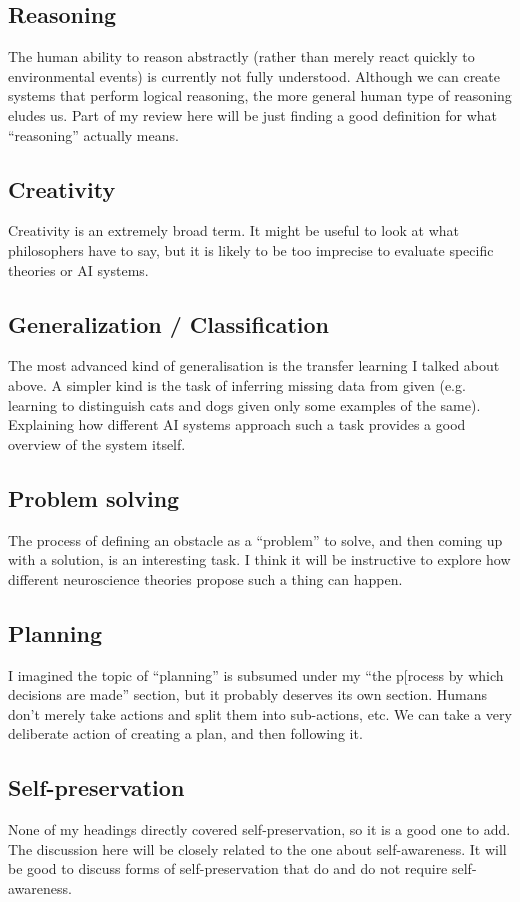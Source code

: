 \documentclass[10pt,a4paper]{article}
\newcommand{\nquote}[1]{``{#1}''}
\begin{document}
\subsection{Reasoning}
The human ability to reason abstractly (rather than merely react quickly to environmental events) is currently not fully understood. Although we can create systems that perform logical reasoning, the more general human type of reasoning eludes us. Part of my review here will be just finding a good definition for what \nquote{reasoning} actually means.

\subsection{Creativity}
Creativity is an extremely broad term. It might be useful to look at what philosophers have to say, but it is likely to be too imprecise to evaluate specific theories or AI systems.

\subsection{Generalization / Classification}
The most advanced kind of generalisation is the transfer learning I talked about above. A simpler kind is the task of inferring missing data from given (e.g. learning to distinguish cats and dogs given only some examples of the same). Explaining how different AI systems approach such a task provides a good overview of the system itself.

\subsection{Problem solving}
The process of defining an obstacle as a \nquote{problem} to solve, and then coming up with a solution, is an interesting task. I think it will be instructive to explore how different neuroscience theories propose such a thing can happen.

\subsection{Planning}
I imagined the topic of \nquote{planning} is subsumed under my \nquote{the p[rocess by which decisions are made} section, but it probably deserves its own section. Humans don't merely take actions and split them into sub-actions, etc. We can take a very deliberate action of creating a plan, and then following it.

\subsection{Self-preservation}
None of my headings directly covered self-preservation, so it is a good one to add. The discussion here will be closely related to the one about self-awareness. It will be good to discuss forms of self-preservation that do and do not require self-awareness.
\end{document}
